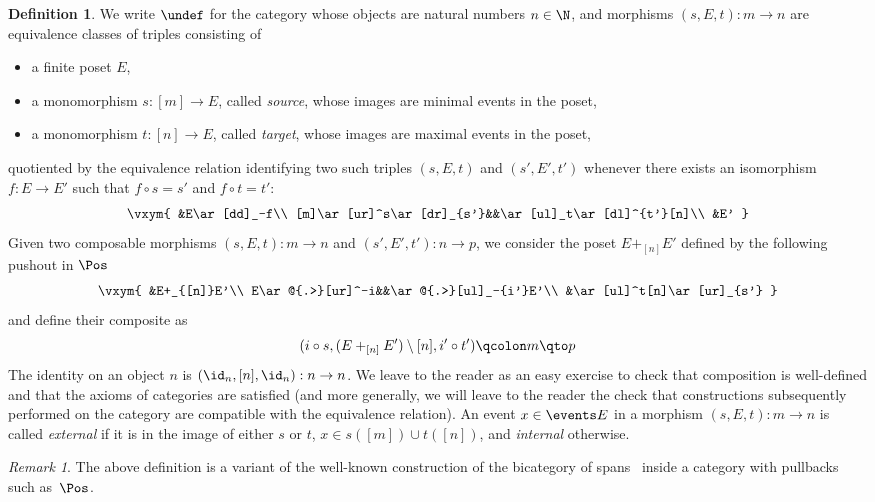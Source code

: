 \documentclass[submission,copyright,creativecommons]{eptcs}
\let\P\undef
\theoremstyle{definition}
\newtheorem{definition}[theorem]{Definition}
\theoremstyle{remark}
\newtheorem{remark}[theorem]{Remark}
\begin{document}
\begin{definition}
  We write $\P$ for the category whose objects are natural numbers $n\in\N$, and
  morphisms $(s,E,t):m\to n$ are equivalence classes of triples
  consisting of
  \begin{itemize}
  \item a finite poset $E$,
  \item a monomorphism $s:[m]\to E$, called \emph{source}, whose images are
    minimal events in the poset,
  \item a monomorphism $t:[n]\to E$, called \emph{target}, whose images are
    maximal events in the poset,
  \end{itemize}
  quotiented by the equivalence relation identifying two such triples $(s,E,t)$
  and $(s',E',t')$ whenever there exists an isomorphism $f:E\to E'$ such that
  $f\circ s=s'$ and $f\circ t=t'$:
  \[
  \vxym{
    &E\ar[dd]_-f\\
    [m]\ar[ur]^s\ar[dr]_{s'}&&\ar[ul]_t\ar[dl]^{t'}[n]\\
    &E'
  }
  \]
  Given two composable morphisms $(s,E,t):m\to n$ and $(s',E',t'):n\to p$, we
  consider the poset $E+_{[n]}E'$ defined by the following pushout in $\Pos$
  \[
  \vxym{
    &E+_{[n]}E'\\
    E\ar@{.>}[ur]^-i&&\ar@{.>}[ul]_-{i'}E'\\
    &\ar[ul]^t[n]\ar[ur]_{s'}
  }
  \]
  and define their composite as
  \[
  (i\circ s,(E+_{[n]}E')\setminus[n],i'\circ t')
  \qcolon
  m\qto p
  \]
  The identity on an object $n$ is $(\id_n,[n],\id_n):n\to n$. We leave to the
  reader as an easy exercise to check that composition is well-defined and that
  the axioms of categories are satisfied (and more generally, we will leave to
  the reader the check that constructions subsequently performed on the category
  are compatible with the equivalence relation). An event $x\in\events E$ in a
  morphism $(s,E,t):m\to n$ is called \emph{external} if it is in the image of
  either $s$ or $t$, \ie $x\in s([m])\cup t([n])$, and \emph{internal}
  otherwise.
\end{definition}

\begin{remark}
  The above definition is a variant of the well-known construction of the
  bicategory of spans~\cite{benabou1967introduction} inside a category with
  pullbacks such as~$\Pos$.
\end{remark}
\end{document}
